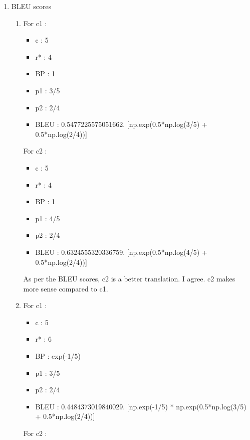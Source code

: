 \documentclass[]{article}
\begin{document}
\begin{enumerate}
\begin{enumerate}
		\item
		BLEU scores		
				\begin{enumerate}
					\item 
					
					For c1 :
					
					\begin{itemize}
						\item c : 5
						\item r* : 4
						\item BP : 1
						\item p1 : 3/5
						\item p2 : 2/4
						\item BLEU : 0.5477225575051662. [np.exp(0.5*np.log(3/5) + 0.5*np.log(2/4))]

					\end{itemize}
					
					For c2 :
					
					\begin{itemize}
						\item c : 5
						\item r* : 4
						\item BP : 1
						\item p1 : 4/5
						\item p2 : 2/4
						\item BLEU : 0.6324555320336759. [np.exp(0.5*np.log(4/5) + 0.5*np.log(2/4))]

					\end{itemize}
					
					As per the BLEU scores, c2 is a better translation. I agree.  c2 makes more sense compared to c1.
					
					\item
					
					For c1 :
					
					\begin{itemize}
						\item c : 5
						\item r* : 6
						\item BP : exp(-1/5)
						\item p1 : 3/5
						\item p2 : 2/4
						\item BLEU : 0.4484373019840029. [np.exp(-1/5) * np.exp(0.5*np.log(3/5) + 0.5*np.log(2/4))]

					\end{itemize}
					
					For c2 :
					

\end{enumerate}
\end{enumerate}
\end{enumerate}
\end{document}
